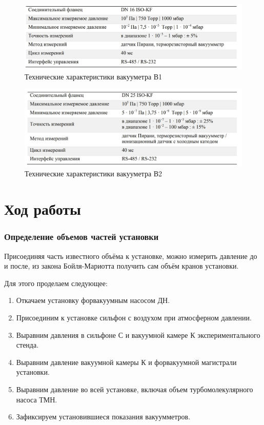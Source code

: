 \documentclass[12pt,a4paper]{article}
\begin{document}
	\begin{figure}[H]
		\caption{Технические характеристики вакууметра В1}
		\label{fig:B1}
		\centering
		\includegraphics[width = 12 cm]{res/V1_technical.jpg}
	\end{figure}
	\begin{figure}[H]
		\caption{Технические характеристики вакууметра В2}
		\label{fig:B2}
		\centering
		\includegraphics[width = 12 cm]{res/V2_technical.jpg}
	\end{figure}
	
	\section*{Ход работы}
	
	\subsubsection*{Определение объемов частей установки}
	Присоединяя часть известного объёма к установке, можно измерить давление до и после, из закона Бойля-Мариотта получить сам объём кранов установки.
	
	Для этого проделаем следующее:
	\begin{enumerate}
		\item Откачаем установку форвакуумным насосом ДН.
		\item Присоединим к установке сильфон с воздухом при атмосферном давлении.
		\item Выравним давления в сильфоне С и вакуумной камере К экспериментального стенда.
		\item Выравним давление вакуумной камеры К и форвакуумной магистрали установки.
		\item Выравним давление во всей установке, включая объем турбомолекулярного насоса ТМН.
		\item Зафиксируем установившиеся показания вакуумметров.
		
	\end{enumerate}
	
\end{document}
